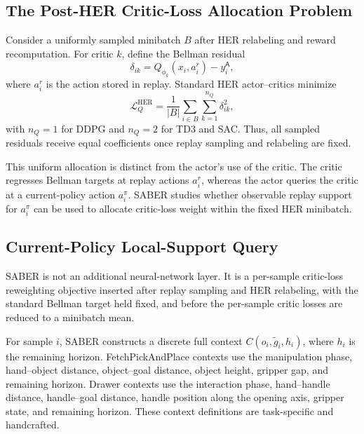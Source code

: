 \documentclass[letterpaper]{article}
\begin{document}
\subsection{The Post-HER Critic-Loss Allocation Problem}

Consider a uniformly sampled minibatch \(B\) after HER relabeling and reward recomputation. For critic \(k\), define the Bellman residual
\begin{equation}
\delta_{ik}=Q_{\phi_k}(x_i,a_i^r)-y_i^{\mathsf{A}},
\end{equation}
where \(a_i^r\) is the action stored in replay. Standard HER actor--critics minimize
\begin{equation}
\mathcal{L}_{Q}^{\mathrm{HER}}
=\frac{1}{|B|}
\sum_{i\in B}
\sum_{k=1}^{n_Q}
\delta_{ik}^{2},
\end{equation}
with \(n_Q=1\) for DDPG and \(n_Q=2\) for TD3 and SAC. Thus, all sampled residuals receive equal coefficients once replay sampling and relabeling are fixed.

This uniform allocation is distinct from the actor's use of the critic. The critic regresses Bellman targets at replay actions \(a_i^r\), whereas the actor queries the critic at a current-policy action \(a_i^\pi\). SABER studies whether observable replay support for \(a_i^\pi\) can be used to allocate critic-loss weight within the fixed HER minibatch.

\subsection{Current-Policy Local-Support Query}

SABER is not an additional neural-network layer. It is a per-sample critic-loss reweighting objective inserted after replay sampling and HER relabeling, with the standard Bellman target held fixed, and before the per-sample critic losses are reduced to a minibatch mean.

For sample \(i\), SABER constructs a discrete full context \(C(o_i,\tilde g_i,h_i)\), where \(h_i\) is the remaining horizon. FetchPickAndPlace contexts use the manipulation phase, hand--object distance, object--goal distance, object height, gripper gap, and remaining horizon. Drawer contexts use the interaction phase, hand--handle distance, handle--goal distance, handle position along the opening axis, gripper state, and remaining horizon. These context definitions are task-specific and handcrafted.
\end{document}
